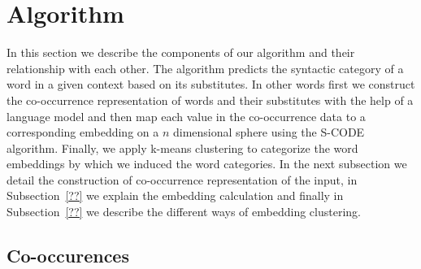 \section{Algorithm}

In this section we describe the components of our algorithm and their
relationship with each other.  The algorithm predicts the syntactic
category of a word in a given context based on its substitutes.  In
other words first we construct the co-occurrence representation of
words and their substitutes with the help of a language model and then
map each value in the co-occurrence data to a corresponding embedding
on a $n$ dimensional sphere using the S-CODE algorithm.  Finally, we
apply k-means clustering to categorize the word embeddings by which we
induced the word categories.  In the next subsection we detail the
construction of co-occurrence representation of the input, in
Subsection~\ref{??} we explain the embedding calculation and finally
in Subsection~\ref{??} we describe the different ways of embedding
clustering.

\subsection{Co-occurences}

